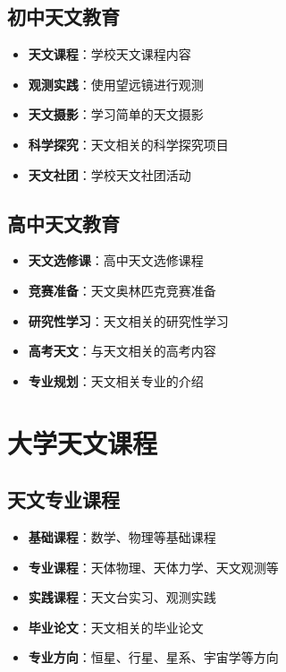 \documentclass[12pt,UTF8]{ctexbook}
\begin{document}
\section{初中天文教育}

\begin{itemize}
  \item \textbf{天文课程}：学校天文课程内容
  \item \textbf{观测实践}：使用望远镜进行观测
  \item \textbf{天文摄影}：学习简单的天文摄影
  \item \textbf{科学探究}：天文相关的科学探究项目
  \item \textbf{天文社团}：学校天文社团活动
\end{itemize}

\section{高中天文教育}

\begin{itemize}
  \item \textbf{天文选修课}：高中天文选修课程
  \item \textbf{竞赛准备}：天文奥林匹克竞赛准备
  \item \textbf{研究性学习}：天文相关的研究性学习
  \item \textbf{高考天文}：与天文相关的高考内容
  \item \textbf{专业规划}：天文相关专业的介绍
\end{itemize}

\chapter{大学天文课程}
\section{天文专业课程}

\begin{itemize}
  \item \textbf{基础课程}：数学、物理等基础课程
  \item \textbf{专业课程}：天体物理、天体力学、天文观测等
  \item \textbf{实践课程}：天文台实习、观测实践
  \item \textbf{毕业论文}：天文相关的毕业论文
  \item \textbf{专业方向}：恒星、行星、星系、宇宙学等方向
\end{itemize}
\end{document}
